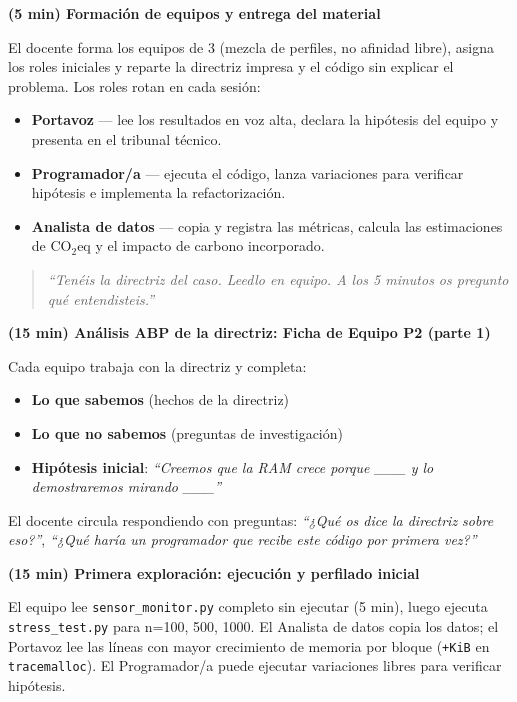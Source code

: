 \textbf{(5 min) Formación de equipos y entrega del material}


El docente forma los equipos de 3 (mezcla de perfiles, no afinidad libre), asigna los roles iniciales y reparte la directriz impresa y el código sin explicar el problema. Los roles rotan en cada sesión:

\begin{itemize}
  \item \textbf{Portavoz} — lee los resultados en voz alta, declara la hipótesis del equipo y presenta en el tribunal técnico.
  \item \textbf{Programador/a} — ejecuta el código, lanza variaciones para verificar hipótesis e implementa la refactorización.
  \item \textbf{Analista de datos} — copia y registra las métricas, calcula las estimaciones de CO$_2$eq y el impacto de carbono incorporado.
\end{itemize}


\begin{quote}
\textit{``Tenéis la directriz del caso. Leedlo en equipo. A los 5 minutos os pregunto qué entendisteis.''}
\end{quote}


\textbf{(15 min) Análisis ABP de la directriz: Ficha de Equipo P2 (parte 1)}


Cada equipo trabaja con la directriz y completa:

\begin{itemize}
\item \textbf{Lo que sabemos} (hechos de la directriz)
\item \textbf{Lo que no sabemos} (preguntas de investigación)
\item \textbf{Hipótesis inicial}: \textit{``Creemos que la RAM crece porque \_\_\_ y lo demostraremos mirando \_\_\_''}
\end{itemize}


El docente circula respondiendo con preguntas: \textit{``¿Qué os dice la directriz sobre eso?''}, \textit{``¿Qué haría un programador que recibe este código por primera vez?''}


\textbf{(15 min) Primera exploración: ejecución y perfilado inicial}


El equipo lee \texttt{sensor\_monitor.py} completo sin ejecutar (5 min), luego ejecuta \texttt{stress\_test.py} para n=100, 500, 1000. El Analista de datos copia los datos; el Portavoz lee las líneas con mayor crecimiento de memoria por bloque (\texttt{+KiB} en \texttt{tracemalloc}). El Programador/a puede ejecutar variaciones libres para verificar hipótesis.


